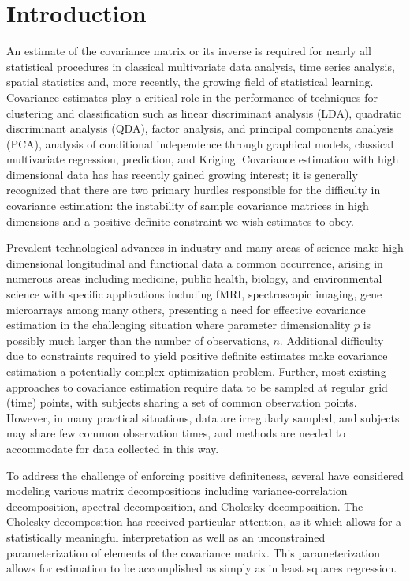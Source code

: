 \documentclass[12pt]{article}
\theoremstyle{definition}
\begin{document}
\section{Introduction}

An estimate of the covariance matrix or its inverse is required for nearly all statistical procedures in classical multivariate data analysis, time series analysis, spatial statistics and, more recently, the growing field of statistical learning. Covariance estimates play a critical role in the performance of techniques for clustering and classification such as linear discriminant analysis (LDA), quadratic discriminant analysis (QDA), factor analysis, and principal components analysis (PCA), analysis of conditional independence through graphical models, classical multivariate regression, prediction, and Kriging. Covariance estimation with high dimensional data has has recently gained growing interest; it is generally recognized that there are two primary hurdles responsible for the difficulty in covariance estimation: the instability of sample covariance matrices in high dimensions and a positive-definite constraint we wish estimates to obey.

Prevalent technological advances in industry and many areas of science make high dimensional longitudinal and functional data a common occurrence, arising in numerous areas including medicine, public health, biology, and environmental science with specific applications including fMRI, spectroscopic imaging, gene microarrays among many others, presenting a need for effective covariance estimation in the challenging situation where parameter dimensionality $p$ is possibly much larger than the number of observations, $n$. Additional difficulty due to constraints required to yield positive definite estimates make covariance estimation a potentially complex optimization problem. Further, most existing approaches to covariance estimation require data to be sampled at regular grid (time) points, with subjects sharing a set of common observation points. However, in many practical situations, data are irregularly sampled, and subjects may share few common observation times, and methods are needed to accommodate for data collected in this way.  

To address the challenge of enforcing positive definiteness, several have considered modeling various matrix decompositions including variance-correlation decomposition, spectral decomposition, and Cholesky decomposition. The Cholesky decomposition has received particular attention, as it which allows for a statistically meaningful interpretation as well as an unconstrained parameterization of elements of the covariance matrix. This parameterization allows for estimation to be accomplished as simply as in least squares regression. 
\end{document}
